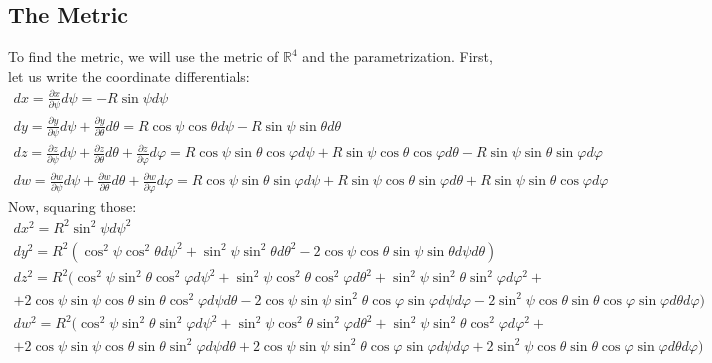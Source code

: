 \documentclass{article}
\newcommand{\R}{\ensuremath{\mathbb{R}}}
\begin{document}
\subsection{The Metric}
To find the metric, we will use the metric of $\R^4$ and the parametrization. First, let us write the coordinate differentials:
\begin{equation}
\begin{gathered}
    dx = \frac{\partial x}{\partial \psi}d\psi = -R\sin\psi d\psi \\
    dy = \frac{\partial y}{\partial \psi}d\psi + \frac{\partial y}{\partial \theta}d\theta = R\cos\psi\cos\theta d\psi - R\sin\psi\sin\theta d\theta \\
    dz = \frac{\partial z}{\partial \psi}d\psi + \frac{\partial z}{\partial \theta}d\theta + \frac{\partial z}{\partial \varphi}d\varphi = R\cos\psi\sin\theta\cos\varphi d\psi + R\sin\psi\cos\theta\cos\varphi d\theta - R\sin\psi\sin\theta\sin\varphi d\varphi \\
    dw = \frac{\partial w}{\partial \psi}d\psi + \frac{\partial w}{\partial \theta}d\theta + \frac{\partial w}{\partial \varphi}d\varphi = R\cos\psi\sin\theta\sin\varphi d\psi + R\sin\psi\cos\theta\sin\varphi d\theta + R\sin\psi\sin\theta\cos\varphi d\varphi
\end{gathered}
\end{equation}
Now, squaring those:
\begin{equation}
\begin{gathered}
    dx^2 = R^2\sin^2\psi d\psi^2 \\
    dy^2 = R^2\left(
        \cos^2\psi\cos^2\theta d\psi^2 + \sin^2\psi\sin^2\theta d\theta^2 - 2\cos\psi\cos\theta\sin\psi\sin\theta d\psi d\theta
    \right) \\
    dz^2 = R^2(
        \cos^2\psi\sin^2\theta\cos^2\varphi d\psi^2 +
        \sin^2\psi\cos^2\theta\cos^2\varphi d\theta^2 +
        \sin^2\psi\sin^2\theta\sin^2\varphi d\varphi^2 + \\
        + 2\cos\psi\sin\psi\cos\theta\sin\theta\cos^2\varphi d\psi d\theta
        - 2\cos\psi\sin\psi\sin^2\theta\cos\varphi\sin\varphi d\psi d\varphi
        - 2\sin^2\psi\cos\theta\sin\theta\cos\varphi\sin\varphi d\theta d\varphi
    ) \\
    dw^2 = R^2(
        \cos^2\psi\sin^2\theta\sin^2\varphi d\psi^2 +
        \sin^2\psi\cos^2\theta\sin^2\varphi d\theta^2 +
        \sin^2\psi\sin^2\theta\cos^2\varphi d\varphi^2 + \\
        + 2\cos\psi\sin\psi\cos\theta\sin\theta\sin^2\varphi d\psi d\theta
        + 2\cos\psi\sin\psi\sin^2\theta\cos\varphi\sin\varphi d\psi d\varphi
        + 2\sin^2\psi\cos\theta\sin\theta\cos\varphi\sin\varphi d\theta d\varphi
    )
\end{gathered}
\end{equation}
\end{document}
